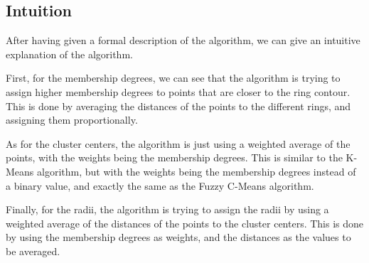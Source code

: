 \documentclass[conference]{IEEEtran}
\begin{document}
\subsection{Intuition}
After having given a formal description of the algorithm, we can give an intuitive explanation of the algorithm.

First, for the membership degrees, we can see that the algorithm is trying to assign higher membership degrees to points that are closer to the ring contour.
This is done by averaging the distances of the points to the different rings, and assigning them proportionally.

As for the cluster centers, the algorithm is just using a weighted average of the points, with the weights being the membership degrees.
This is similar to the K-Means algorithm, but with the weights being the membership degrees instead of a binary value, and exactly the same as the Fuzzy C-Means algorithm.

Finally, for the radii, the algorithm is trying to assign the radii by using a weighted average of the distances of the points to the cluster centers.
This is done by using the membership degrees as weights, and the distances as the values to be averaged.
\end{document}
